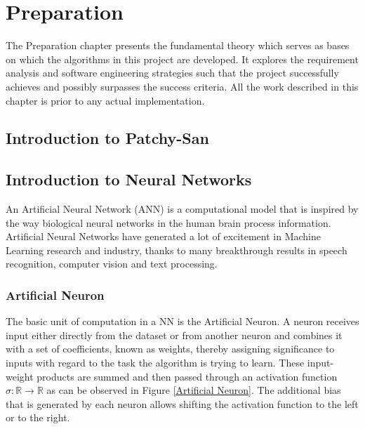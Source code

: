 

\chapter{Preparation}

The Preparation chapter presents the fundamental theory which serves as bases on which the algorithms in this project are developed. It explores the requirement analysis and software engineering strategies such that the project successfully achieves and possibly surpasses the success criteria. All the work described in this chapter is prior to any actual implementation.

\section{Introduction to Patchy-San}

\section{Introduction to Neural Networks}

An Artificial Neural Network (ANN) is a computational model that is inspired by the way biological neural networks in the human brain process information. Artificial Neural Networks have generated a lot of excitement in Machine Learning research and industry, thanks to many breakthrough results in speech recognition, computer vision and text processing.

\subsection{Artificial Neuron}

The basic unit of computation in a NN is the Artificial Neuron. A neuron receives input either directly from the dataset or from another neuron and combines it with a set of coefficients, known as weights, thereby assigning significance to inputs with regard to the task the algorithm is trying to learn. These input-weight products are summed and then passed through an activation function $\sigma : \mathbb{R} \rightarrow \mathbb{R}$ as can be observed in Figure \ref{Artificial Neuron}.
The additional bias that is generated by each neuron allows shifting the activation function to the left or to the right. \\

